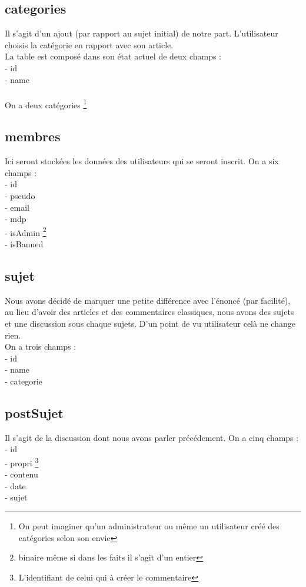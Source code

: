 \documentclass{article}
\begin{document}
    \subsection{categories}
    Il s'agit d'un ajout (par rapport au sujet initial) de notre part. 
    L'utilisateur choisis la catégorie en rapport avec son article. \\
    La table est composé dans son état actuel de deux champs : \\
    - id \\
    - name \\
    \\
    On a deux catégories \footnote{On peut imaginer qu'un administrateur ou même un utilisateur créé des catégories selon son envie}
    \newpage
    \subsection{membres}
    Ici seront stockées les données des utilisateurs qui se seront inscrit. On a six champs : \\
    - id \\ 
    - pseudo \\ 
    - email \\
    - mdp \\ 
    - isAdmin \footnote{binaire même si dans les faits il s'agit d'un entier}  \\
    - isBanned \footnotemark[2] \\ 
    \subsection{sujet}
    Nous avons décidé de marquer une petite différence avec l'énoncé (par facilité),
    au lieu d'avoir des articles et des commentaires classiques, nous avons des sujets et une discussion sous chaque sujets.
    D'un point de vu utilisateur celà ne change rien. \\ 
    On a trois champs : \\
    - id \\
    - name \\ 
    - categorie 
    \subsection{postSujet}
    Il s'agit de la discussion dont nous avons parler précédement. On a cinq champs : \\
    - id \\ 
    - propri \footnote{L'identifiant de celui qui à créer le commentaire} \\
    - contenu \\ 
    - date \\
    - sujet \\ 
    \newpage 
\end{document}
